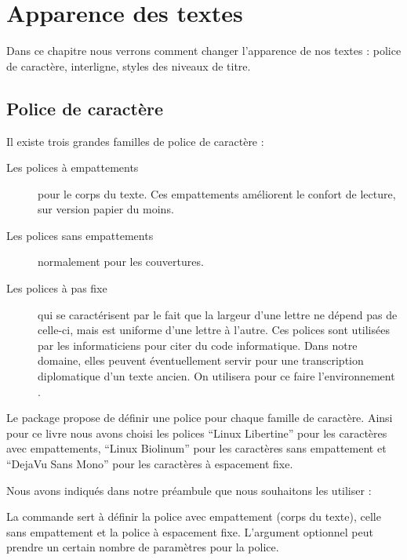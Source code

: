 \chapter{Apparence des textes}


\begin{prealable}
Dans ce chapitre nous verrons comment changer l'apparence de nos textes : police de caractère, interligne, styles des niveaux de titre.  
\end{prealable}

\section{Police de caractère}

Il existe trois grandes familles de police de caractère : 
\begin{description}
\item[Les polices à empattements]pour le corps du texte. Ces empattements améliorent le confort de lecture, sur version papier du moins. 
\item[Les polices sans empattements]normalement pour les couvertures.
\item[Les polices à pas fixe]qui se caractérisent par le fait que la largeur d'une lettre ne dépend pas de celle-ci, mais est uniforme d'une lettre à l'autre. Ces polices sont utilisées par les informaticiens pour citer du code informatique. Dans notre domaine, elles peuvent éventuellement servir pour une transcription diplomatique d'un texte ancien. On utilisera pour ce faire l'environnement .
\end{description}

Le package  propose de définir une police pour chaque famille de caractère. Ainsi pour ce livre nous avons choisi les polices \enquote{Linux Libertine} pour les caractères avec empattements, \enquote{Linux Biolinum} pour les caractères sans empattement et \enquote{DejaVu  Sans Mono} pour les caractères à espacement fixe.

Nous avons indiqués dans notre préambule que nous souhaitons les utiliser :

\begin{latexcode}
\setmainfont[Mapping=tex-text]{Linux Libertine}
\setsansfont[Mapping=tex-text]{Linux Biolinum}
\setmonofont[Scale=0.75]{DejaVu  Sans Mono}
\end{latexcode}

La commande  sert à définir la police avec empattement (corps du texte),  celle sans empattement et  la police à espacement fixe. L'argument optionnel peut prendre un certain nombre de paramètres pour la police. 

